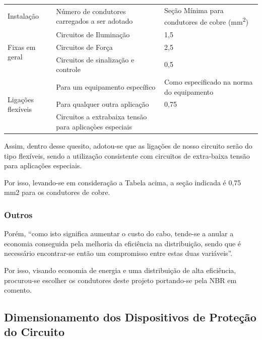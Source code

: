 \begin{table}[h]
\begin{tabular}{lll}
Instalação                          & Número de condutores carregados a ser adotado           & Seção Mínima para condutores de cobre (mm\textsuperscript{2}) \\
\multirow{3}{*}{Fixas em geral}     & Circuitos de Iluminação                                 & 1,5                                        \\
                                    & Circuitos de Força                                      & 2,5                                        \\
                                    & Circuitos de sinalização e controle                     & 0,5                                        \\
\multirow{3}{*}{Ligações flexíveis} & Para um equipamento específico                          & Como especificado na norma do equipamento  \\
                                    & Para qualquer outra aplicação                           & 0,75                                       \\
                                    & Circuitos a extrabaixa tensão para aplicaçòes especiais &                                           
\end{tabular}
\end{table}

Assim, dentro desse quesito, adotou-se que as ligações de nosso circuito serão do tipo flexíveis, sendo a utilização consistente com circuitos de extra-baixa tensão para aplicações especiais. 

Por isso, levando-se em consideração a Tabela acima, a seção indicada é 0,75 mm2 para os condutores de cobre.

\subsubsection{Outros}

Porém, “como isto significa aumentar o custo do cabo, tende-se a anular a economia conseguida pela melhoria da eficiência na distribuição, sendo que é necessário encontrar-se então um compromisso entre estas duas variáveis”.

Por isso, visando economia de energia e uma distribuição de alta eficiência, procurou-se escolher os condutores deste projeto portando-se pela NBR em comento.

\subsection{Dimensionamento dos Dispositivos de Proteção do Circuito}

